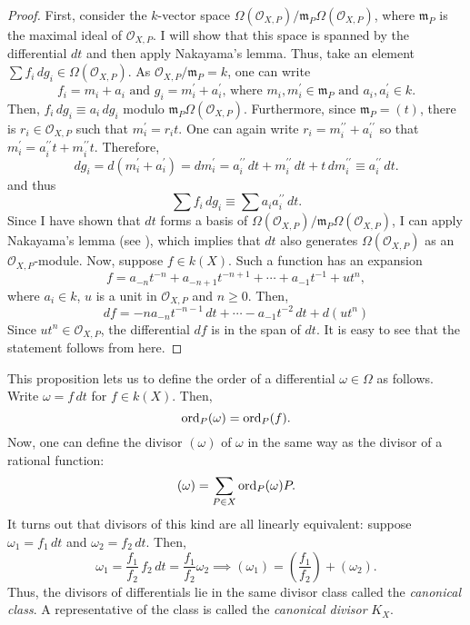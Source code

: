 \begin{proof}
  First, consider the $k$-vector space
  $\Omega\left(\mathscr{O}_{X,P}\right)/\mathfrak{m}_{P}\Omega\left(
    \mathscr{O}_{X,P}\right)$, where
  $\mathfrak{m}_{P}$ is the maximal ideal of $\mathscr{O}_{X,P}$. I will show
  that this space is spanned by the differential $dt$ and then apply
  Nakayama's lemma. Thus, take an element $\sum f_{i}\,dg_{i}\in\Omega\left(
    \mathscr{O}_{X,P}\right)$. As $\mathscr{O}_{X,P}/\mathfrak{m}_{P}=k$,
  one can write
  \[
    f_{i}=m_{i}+a_{i}\text{ and }g_{i}=m_{i}^{\prime}+a_{i}^{\prime}
    \text{, where } m_{i}, m_{i}^{\prime}\in\mathfrak{m}_{P}
    \text{ and } a_{i}, a_{i}^{\prime}\in k.
  \]
  Then, $f_{i}\,dg_{i}\equiv a_{i}\,dg_{i}$ modulo
  $\mathfrak{m}_{P}\Omega\left(\mathscr{O}_{X,P}\right)$.
  Furthermore, since $\mathfrak{m}_{P}=(t)$, there is
  $r_{i}\in\mathscr{O}_{X,P}$ such that $m_{i}^{\prime}=r_{i}t$. One can again
  write $r_{i}=m_{i}^{\prime\prime}+a_{i}^{\prime\prime}$ so that
  $m_{i}^{\prime}=a_{i}^{\prime\prime}t+m_{i}^{\prime\prime}t$. Therefore,
  \[
    dg_{i}=d\left(m_{i}^{\prime}+a_{i}^{\prime}\right)=dm_{i}^{\prime}
    =a_{i}^{\prime\prime}\,dt+m_{i}^{\prime\prime}\,dt+t\,dm_{i}^{\prime\prime}
    \equiv a_{i}^{\prime\prime}\,dt.
  \]
  and thus
  \[
    \sum f_{i}\,dg_{i}\equiv \sum a_{i}a_{i}^{\prime\prime}\,dt.
  \]
  Since I have shown that $dt$ forms a basis of
  $\Omega\left(\mathscr{O}_{X,P}\right)/\mathfrak{m}_{P}\Omega\left(
    \mathscr{O}_{X,P}\right)$, I can apply Nakayama's lemma
  (see \cite[Proposition 2.8]{am}), which implies that $dt$ also generates
  $\Omega\left(\mathscr{O}_{X,P}\right)$ as an $\mathscr{O}_{X,P}$-module.
  Now, suppose $f\in k(X)$. Such a function has an expansion
  \[
    f=a_{-n}t^{-n}+a_{-n+1}t^{-n+1}+\cdots +a_{-1}t^{-1}+ut^{n},
  \]
  where $a_{i}\in k$, $u$ is a unit in $\mathscr{O}_{X,P}$ and $n\geq 0$.
  Then,
  \[
    df=-na_{-n}t^{-n-1}\,dt+\cdots-a_{-1}t^{-2}\,dt+d\left(ut^{n}\right)
  \]
  Since $ut^{n}\in\mathscr{O}_{X,P}$, the differential $df$ is in the span
  of $dt$. It is easy to see that the statement follows from here.
\end{proof}
This proposition lets us to define the order of a differential
$\omega\in\Omega$ as follows. Write $\omega=f\,dt$ for $f\in k(X)$. Then,
\[
  \operatorname{ord}_{P}(\omega)=\operatorname{ord}_{P}(f).
\]
Now, one can define the divisor $(\omega)$ of $\omega$ in the same way as
the divisor of a rational function:
\[
  (\omega)=\sum_{P\in X}\operatorname{ord}_{P}(\omega)P.
\]
It turns out that divisors of this kind are all linearly equivalent: suppose
$\omega_{1}=f_{1}\,dt$ and $\omega_{2}=f_{2}\,dt$. Then,
\[
  \omega_{1}=\frac{f_{1}}{f_{2}}\, f_{2}\,dt=\frac{f_{1}}{f_{2}}\omega_{2}
  \implies (\omega_{1})=\left(\frac{f_{1}}{f_{2}}\right)+(\omega_{2}).
\]
Thus, the divisors of differentials lie in the same divisor class called the
\emph{canonical class}. A representative of the class is called the
\emph{canonical divisor} $K_{X}$.

